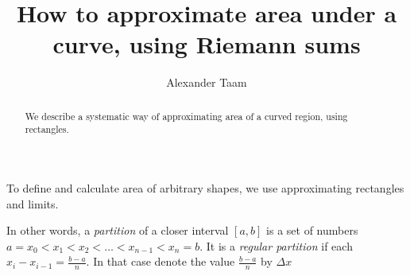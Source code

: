 \documentclass{ximera}
\title{How to approximate area under a curve, using Riemann sums}
\author{Alexander Taam}
\begin{document}
\begin{abstract}
  We describe a systematic way of approximating area of a curved region, using rectangles.
\end{abstract}
\maketitle

To define and calculate area of arbitrary shapes, we use approximating rectangles and limits.

\begin{definition}\label{def:partition}
\begin{foldable}
 In other words, a \emph{partition} of a closer interval $[a,b]$ is a set of numbers $a=x_0<x_1<x_2<\dots<x_{n-1}<x_n=b$. It is a \emph{regular partition} if each $x_i-x_{i-1}=\frac{b-a}{n}$. In that case denote the value $\frac{b-a}{n}$ by $\Delta x$
\end{foldable}
\end{definition}
\end{document}
